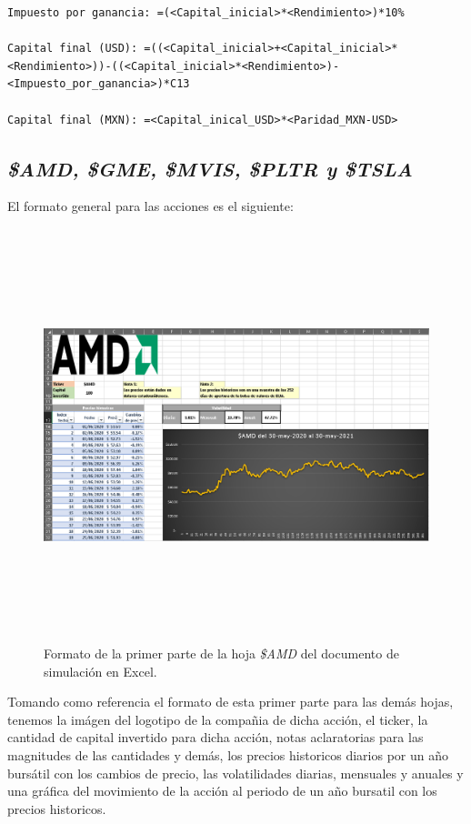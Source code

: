 \documentclass[letterpaper, 12pt]{article}
\begin{document}
\begin{justify}
\begin{verbatim}
Impuesto por ganancia: =(<Capital_inicial>*<Rendimiento>)*10%

Capital final (USD): =((<Capital_inicial>+<Capital_inicial>*
<Rendimiento>))-((<Capital_inicial>*<Rendimiento>)-
<Impuesto_por_ganancia>)*C13

Capital final (MXN): =<Capital_inical_USD>*<Paridad_MXN-USD>\end{verbatim}
        \subsection{\emph{\$AMD, \$GME, \$MVIS, \$PLTR y \$TSLA}}
        \justify
        El formato general para las acciones es el siguiente:
        \begin{figure}[H]
            \centering
            \includegraphics[height=12cm,width=14cm]{formato_acciones_1.PNG}
            \caption{Formato de la primer parte de la hoja \emph{\$AMD} del documento de simulación en Excel.}
        \end{figure}
        \justify
        Tomando como referencia el formato de esta primer parte para las demás hojas, tenemos la imágen del logotipo de la compañia de dicha acción, el ticker, la cantidad de capital invertido para dicha acción, notas aclaratorias para las magnitudes de las cantidades y demás, los precios historicos
        diarios por un año bursátil con los cambios de precio, las volatilidades diarias, mensuales y anuales y una gráfica del movimiento de la acción al periodo de un año bursatil con los precios historicos.

\end{justify}
\end{document}
